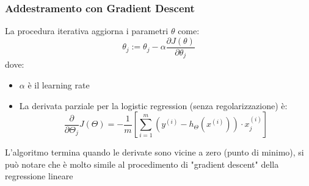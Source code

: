 \documentclass[10pt,oneside,a4paper]{article}
\begin{document}
	\subsubsection{Addestramento con Gradient Descent}
	La procedura iterativa aggiorna i parametri $\theta$ come:
	\[
	\theta_j := \theta_j - \alpha \frac{\partial J(\theta)}{\partial \theta_j}
	\]
	dove:
	\begin{itemize}
		\item $\alpha$ è il learning rate
		\item La derivata parziale per la logistic regression (senza regolarizzazione) è:
		\[
		\frac{\partial}{\partial\Theta_j}J(\Theta) = -\frac{1}{m}[ \sum_{i=1}^{m} (y^{(i)} - h_{\Theta}(x^{(i)})) \cdot x_j^{(i)} ]
		\]	
	\end{itemize}
	L'algoritmo termina quando le derivate sono vicine a zero (punto di minimo), si può notare che è molto simile al procedimento di "gradient descent" della regressione lineare
	
	
	
\end{document}
